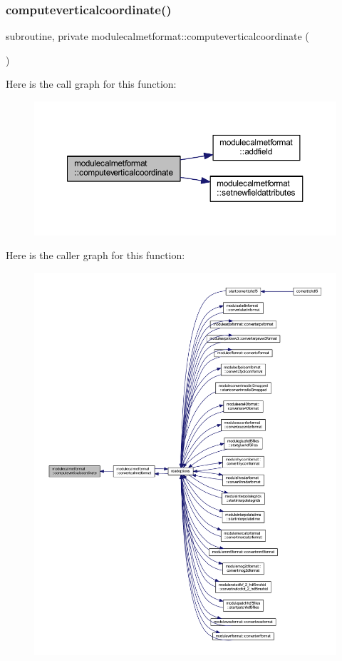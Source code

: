 \subsubsection{\texorpdfstring{computeverticalcoordinate()}{computeverticalcoordinate()}}
{\footnotesize\ttfamily subroutine, private modulecalmetformat\+::computeverticalcoordinate (\begin{DoxyParamCaption}{ }\end{DoxyParamCaption})\hspace{0.3cm}{\ttfamily [private]}}

Here is the call graph for this function\+:\nopagebreak
\begin{figure}[H]
\begin{center}
\leavevmode
\includegraphics[width=350pt]{namespacemodulecalmetformat_abd990931d70766e3d45c4c5e94a1924f_cgraph}
\end{center}
\end{figure}
Here is the caller graph for this function\+:\nopagebreak
\begin{figure}[H]
\begin{center}
\leavevmode
\includegraphics[width=350pt]{namespacemodulecalmetformat_abd990931d70766e3d45c4c5e94a1924f_icgraph}
\end{center}
\end{figure}
